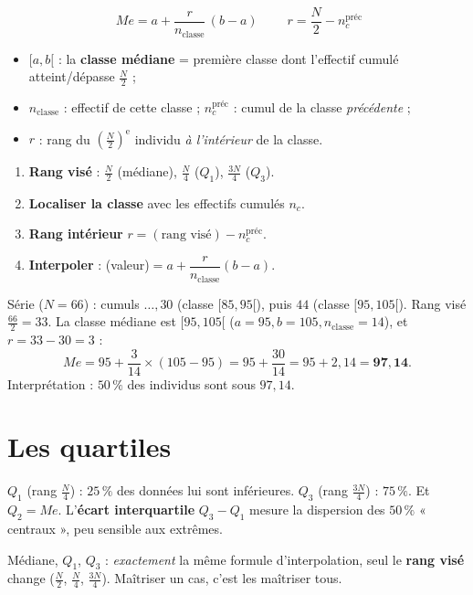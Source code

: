 \documentclass[11pt,a4paper]{article}
\newcommand{\med}{M\!e}
\begin{document}
\begin{formule}
\[
\boxed{\;\med=a+\frac{r}{n_{\text{classe}}}\,(b-a)\;}\qquad r=\frac{N}{2}-n_c^{\text{préc}}
\]
\begin{itemize}
  \item $[a,b[$ : la \textbf{classe médiane} = première classe dont l'effectif cumulé atteint/dépasse
        $\tfrac{N}{2}$ ;
  \item $n_{\text{classe}}$ : effectif de cette classe ; $n_c^{\text{préc}}$ : cumul de la classe
        \emph{précédente} ;
  \item $r$ : rang du $\left(\tfrac{N}{2}\right)^{\text{e}}$ individu \emph{à l'intérieur} de la classe.
\end{itemize}
\end{formule}

\begin{methode}
\begin{enumerate}
  \item \textbf{Rang visé} : $\tfrac{N}{2}$ (médiane), $\tfrac{N}{4}$ ($Q_1$), $\tfrac{3N}{4}$ ($Q_3$).
  \item \textbf{Localiser la classe} avec les effectifs cumulés $n_c$.
  \item \textbf{Rang intérieur} $r=(\text{rang visé})-n_c^{\text{préc}}$.
  \item \textbf{Interpoler} : (valeur)$=a+\dfrac{r}{n_{\text{classe}}}(b-a)$.
\end{enumerate}
\end{methode}

\begin{exemple}
Série ($N=66$) : cumuls $\ldots,30$ (classe $[85,95[$), puis $44$ (classe $[95,105[$).
Rang visé $\tfrac{66}{2}=33$. La classe médiane est $[95,105[$ ($a=95,b=105,n_{\text{classe}}=14$),
et $r=33-30=3$ :
\[ \med=95+\frac{3}{14}\times(105-95)=95+\frac{30}{14}=95+2{,}14=\mathbf{97{,}14}. \]
Interprétation : $50\,\%$ des individus sont sous $97{,}14$.
\end{exemple}

\section{Les quartiles}

\begin{definition}[quartiles]
$Q_1$ (rang $\tfrac{N}{4}$) : $25\,\%$ des données lui sont inférieures. $Q_3$ (rang $\tfrac{3N}{4}$) :
$75\,\%$. Et $Q_2=\med$. L'\textbf{écart interquartile} $Q_3-Q_1$ mesure la dispersion des $50\,\%$
« centraux », peu sensible aux extrêmes.
\end{definition}

\begin{remarque}
Médiane, $Q_1$, $Q_3$ : \emph{exactement} la même formule d'interpolation, seul le \textbf{rang visé}
change ($\tfrac N2$, $\tfrac N4$, $\tfrac{3N}4$). Maîtriser un cas, c'est les maîtriser tous.
\end{remarque}
\end{document}
